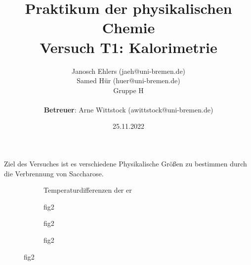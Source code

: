 \documentclass[a4paper, 11pt]{article}
\title{Praktikum der physikalischen Chemie\\\large Versuch T1: Kalorimetrie}
\author{Janosch Ehlers (jaeh@uni-bremen.de)\\ Samed Hür (huer@uni-bremen.de)\\\small Gruppe H \\\\ \textbf{Betreuer}: Arne Wittstock (awittstock@uni-bremen.de)}
\date{25.11.2022}
\begin{document}
	\thispagestyle{empty}
	\maketitle
	\newpage

	Ziel des Versuches ist es verschiedene Physikalische Größen zu bestimmen durch die Verbrennung von Saccharose.





\begin{figure}
	\centering

	\begin{subfigure}{0.4\textwidth}
		\centering
		
		\caption{Temperaturdifferenzen der er}
	\end{subfigure}
	\hspace{5mm}
	\begin{subfigure}{0.4\textwidth}
		\centering
		
		\caption{fig2}
	\end{subfigure}
	\hfill
	\begin{subfigure}{0.4\textwidth}
		\centering
		
		\caption{fig2}
	\end{subfigure}
	\hspace{5mm}
	\begin{subfigure}{0.4\textwidth}
		\centering
		
		\caption{fig2}
	\end{subfigure}

\end{figure}


\printbibliography
\end{document}
